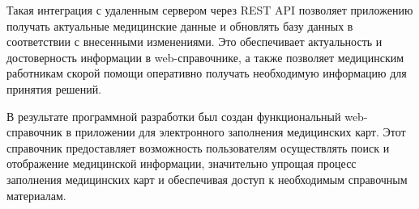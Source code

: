 Такая интеграция с удаленным сервером через REST API позволяет приложению получать актуальные медицинские данные и обновлять базу данных в соответствии с внесенными изменениями. Это обеспечивает актуальность и достоверность информации в web-справочнике, а также позволяет медицинским работникам скорой помощи оперативно получать необходимую информацию для принятия решений.

В результате программной разработки был создан функциональный web-справочник в приложении для электронного заполнения медицинских карт. Этот справочник предоставляет возможность пользователям осуществлять поиск и отображение медицинской информации, значительно упрощая процесс заполнения медицинских карт и обеспечивая доступ к необходимым справочным материалам.
